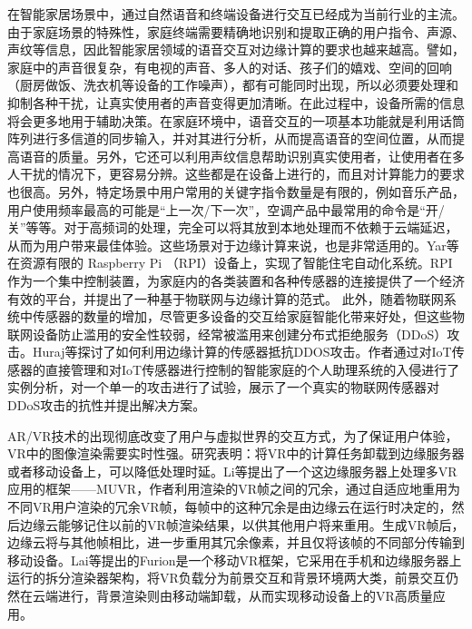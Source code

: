 \documentclass[UTF8,12pt,twoside,a4paper]{ctexart} %
\begin{document}
\begin{flushleft}
\end{flushleft}%
\indent\setlength{\parindent}{2em}%
\songti
\hspace{1.6em}%
在智能家居场景中，通过自然语音和终端设备进行交互已经成为当前行业的主流。由于家庭场景的特殊性，家庭终端需要精确地识别和提取正确的用户指令、声源、声纹等信息，因此智能家居领域的语音交互对边缘计算的要求也越来越高。譬如，家庭中的声音很复杂，有电视的声音、多人的对话、孩子们的嬉戏、空间的回响（厨房做饭、洗衣机等设备的工作噪声），都有可能同时出现，所以必须要处理和抑制各种干扰，让真实使用者的声音变得更加清晰。在此过程中，设备所需的信息将会更多地用于辅助决策。在家庭环境中，语音交互的一项基本功能就是利用话筒阵列进行多信道的同步输入，并对其进行分析，从而提高语音的空间位置，从而提高语音的质量。另外，它还可以利用声纹信息帮助识别真实使用者，让使用者在多人干扰的情况下，更容易分辨。这些都是在设备上进行的，而且对计算能力的要求也很高。另外，特定场景中用户常用的关键字指令数量是有限的，例如音乐产品，用户使用频率最高的可能是“上一次/下一次”，空调产品中最常用的命令是“开/关”等等。对于高频词的处理，完全可以将其放到本地处理而不依赖于云端延迟，从而为用户带来最佳体验。这些场景对于边缘计算来说，也是非常适用的。Yar等\cite{RN8}在资源有限的 Raspberry Pi （RPI）设备上，实现了智能住宅自动化系统。RPI作为一个集中控制装置，为家庭内的各类装置和各种传感器的连接提供了一个经济有效的平台，并提出了一种基于物联网与边缘计算的范式。
此外，随着物联网系统中传感器的数量的增加，尽管更多设备的交互给家庭智能化带来好处，但这些物联网设备防止滥用的安全性较弱，经常被滥用来创建分布式拒绝服务（DDoS）攻击。Huraj等\cite{RN9}探讨了如何利用边缘计算的传感器抵抗DDOS攻击。作者通过对IoT传感器的直接管理和对IoT传感器进行控制的智能家庭的个人助理系统的入侵进行了实例分析，对一个单一的攻击进行了试验，展示了一个真实的物联网传感器对 DDoS攻击的抗性并提出解决方案。
\vspace{10pt}

\begin{flushleft}
\end{flushleft}%
\indent\setlength{\parindent}{2em}%
\songti
\hspace{1.6em}%
AR/VR技术的出现彻底改变了用户与虚拟世界的交互方式，为了保证用户体验，VR中的图像渲染需要实时性强。研究表明：将VR中的计算任务卸载到边缘服务器或者移动设备上，可以降低处理时延。Li等\cite{RN10}提出了一个这边缘服务器上处理多VR应用的框架——MUVR，作者利用渲染的VR帧之间的冗余，通过自适应地重用为不同VR用户渲染的冗余VR帧，每帧中的这种冗余是由边缘云在运行时决定的，然后边缘云能够记住以前的VR帧渲染结果，以供其他用户将来重用。生成VR帧后，边缘云将与其他帧相比，进一步重用其冗余像素，并且仅将该帧的不同部分传输到移动设备。Lai等\cite{RN11}提出的Furion是一个移动VR框架，它采用在手机和边缘服务器上运行的拆分渲染器架构，将VR负载分为前景交互和背景环境两大类，前景交互仍然在云端进行，背景渲染则由移动端卸载，从而实现移动设备上的VR高质量应用。
\vspace{10pt}
\end{document}
